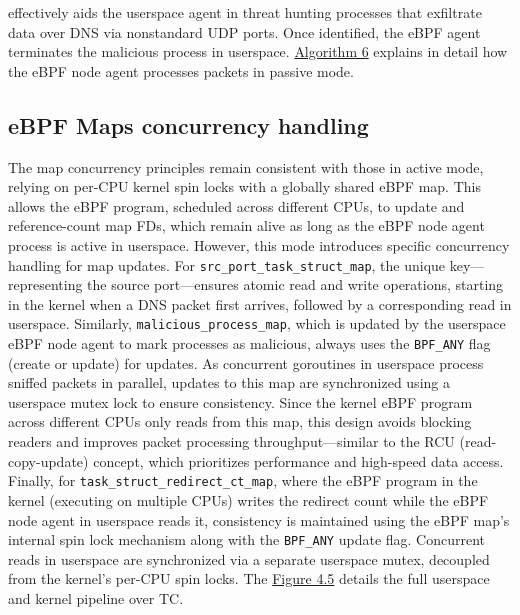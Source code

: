 \documentclass [11pt, proquest] {uwthesis}[2020/02/24]
\begin{document}
effectively aids the userspace agent in threat hunting processes that exfiltrate data over DNS via nonstandard UDP ports. Once identified, the eBPF agent terminates the malicious process in userspace. \hyperref[sec:alg6]{Algorithm 6} explains in detail how the eBPF node agent processes packets in passive mode.

\subsection{\textbf{eBPF Maps concurrency handling}}
\label{passive:sec3}
The map concurrency principles remain consistent with those in active mode, relying on per-CPU kernel spin locks with a globally shared eBPF map. This allows the eBPF program, scheduled across different CPUs, to update and reference-count map FDs, which remain alive as long as the eBPF node agent process is active in userspace. However, this mode introduces specific concurrency handling for map updates. For \texttt{src\_port\_task\_struct\_map}, the unique key—representing the source port—ensures atomic read and write operations, starting in the kernel when a DNS packet first arrives, followed by a corresponding read in userspace. Similarly, \texttt{malicious\_process\_map}, which is updated by the userspace eBPF node agent to mark processes as malicious, always uses the \texttt{BPF\_ANY} flag (create or update) for updates. As concurrent goroutines in userspace process sniffed packets in parallel, updates to this map are synchronized using a userspace mutex lock to ensure consistency. Since the kernel eBPF program across different CPUs only reads from this map, this design avoids blocking readers and improves packet processing throughput—similar to the RCU (read-copy-update) concept, which prioritizes performance and high-speed data access. Finally, for \texttt{task\_struct\_redirect\_ct\_map}, where the eBPF program in the kernel (executing on multiple CPUs) writes the redirect count while the eBPF node agent in userspace reads it, consistency is maintained using the eBPF map’s internal spin lock mechanism along with the \texttt{BPF\_ANY} update flag. Concurrent reads in userspace are synchronized via a separate userspace mutex, decoupled from the kernel’s per-CPU spin locks. The \hyperref[sec:dp-passive-phase]{Figure 4.5} details the full userspace and kernel pipeline over TC. 
\end{document}
